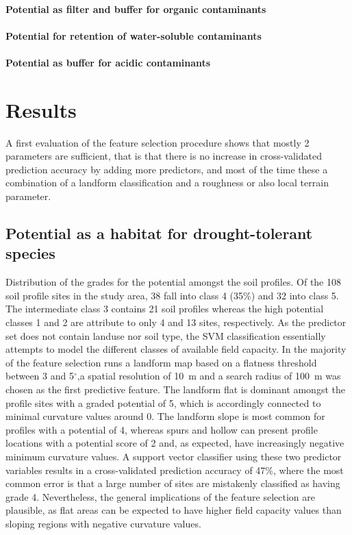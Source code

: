 \documentclass[preprint,12pt,authoryear]{elsarticle}
\begin{document}
\paragraph{Potential as filter and buffer for organic contaminants}

\paragraph{Potential for retention of water-soluble contaminants}

\paragraph{Potential as buffer for acidic contaminants}


\section{Results}
A first evaluation of the feature selection procedure shows that mostly 2 parameters are sufficient, that is that there is no increase in cross-validated prediction accuracy  by adding more predictors, and most of the time these a combination of a landform classification and a roughness or also local terrain parameter.
\subsection{Potential as a habitat for drought-tolerant species}
Distribution of the grades for the potential amongst the soil profiles. Of the 108 soil profile sites in the study area, 38 fall into class 4 (35\%) and 32 into class 5. The intermediate class 3 contains 21 soil profiles whereas the high potential classes 1 and 2 are attribute to only 4 and 13 sites, respectively. 
As the predictor set does not contain landuse nor soil type, the SVM classification essentially attempts to model the different classes of available field capacity. In the majority of the feature selection runs a landform map based on a flatness threshold between 3 and 5$^{\circ}$,a spatial resolution of 10~m and a search radius of 100~m was chosen as the first predictive feature. The landform flat is dominant amongst the profile sites with a graded potential of 5, which is accordingly connected to minimal curvature values around 0. The landform slope is  most common for profiles with a potential  of 4, whereas spurs and hollow can present profile locations with a  potential score of 2 and, as expected, have increasingly negative minimum curvature values. A support vector classifier using these two predictor variables results in a cross-validated prediction accuracy of 47\%, where the most common error is that  a large number of sites are mistakenly classified as having grade 4. Nevertheless, the general implications of the feature selection are plausible, as flat areas  can  be expected to have higher field capacity values than sloping regions with negative curvature values.
\end{document}
